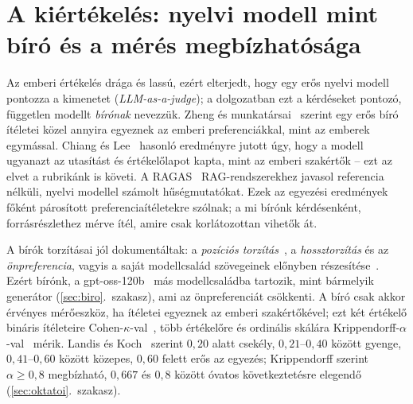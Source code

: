 \section{A kiértékelés: nyelvi modell mint bíró és a mérés megbízhatósága}
\label{sec:irod-biro}

Az emberi értékelés drága és lassú, ezért elterjedt, hogy egy erős nyelvi modell pontozza a kimenetet
(\emph{LLM-as-a-judge}); a dolgozatban ezt a kérdéseket pontozó, független modellt \emph{bírónak}
nevezzük. Zheng és munkatársai~\cite{zheng2023judge} szerint egy erős bíró ítéletei közel annyira egyeznek
az emberi preferenciákkal, mint az emberek egymással. Chiang és Lee~\cite{chiang2023human} hasonló
eredményre jutott úgy, hogy a modell ugyanazt az utasítást és értékelőlapot kapta, mint az emberi
szakértők -- ezt az elvet a rubrikánk is követi. A RAGAS~\cite{es2024ragas} RAG-rendszerekhez javasol
referencia nélküli, nyelvi modellel számolt hűségmutatókat. Ezek az egyezési eredmények főként párosított
preferenciaítéletekre szólnak; a mi bírónk kérdésenként, forrásrészlethez mérve ítél, amire csak
korlátozottan vihetők át.

A bírók torzításai jól dokumentáltak: a \emph{pozíciós torzítás}~\cite{wang2024fair}, a
\emph{hossztorzítás} és az \emph{önpreferencia}, vagyis a saját modellcsalád szövegeinek előnyben
részesítése~\cite{panickssery2024selfpref}. Ezért bírónk, a gpt-oss-120b~\cite{gptoss2025} más
modellcsaládba tartozik, mint bármelyik generátor (\ref{sec:biro}.~szakasz), ami az önpreferenciát
csökkenti. A bíró csak akkor érvényes mérőeszköz, ha ítéletei egyeznek az emberi szakértőkével; ezt két
értékelő bináris ítéleteire Cohen-$\kappa$-val~\cite{cohen1960kappa}, több értékelőre és ordinális skálára
Krippendorff-$\alpha$-val~\cite{krippendorff2004} mérik. Landis és Koch~\cite{landis1977} szerint $0{,}20$
alatt csekély, $0{,}21$--$0{,}40$ között gyenge, $0{,}41$--$0{,}60$ között közepes, $0{,}60$ felett erős az
egyezés; Krippendorff szerint $\alpha\ge0{,}8$ megbízható, $0{,}667$ és $0{,}8$ között óvatos
következtetésre elegendő (\ref{sec:oktatoi}.~szakasz).

